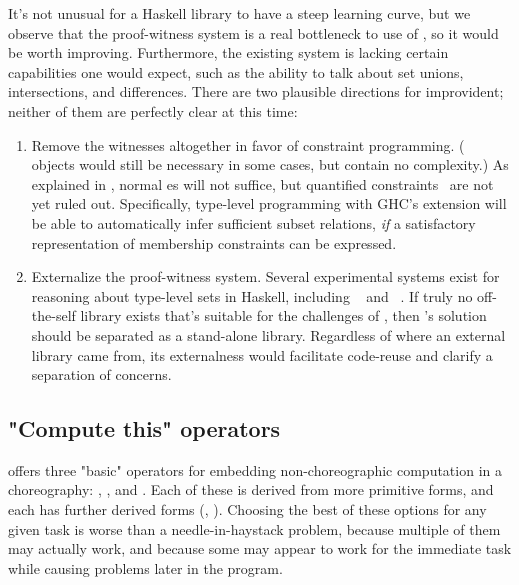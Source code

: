 It's not unusual for a Haskell library to have a steep learning curve,
but we observe that the proof-witness system is a real bottleneck to use of \MultiChor,
so it would be worth improving.
Furthermore, the existing system is lacking certain capabilities one would expect,
such as the ability to talk about set unions, intersections, and differences.
There are two plausible directions for improvident;
neither of them are perfectly clear at this time:
\begin{enumerate}
	\item Remove the witnesses altogether in favor of constraint programming.
		( objects would still be necessary in some cases, but contain no complexity.)
		As explained in , normal es will not suffice,
		but quantified constraints~\cite{bottu2017} are not yet ruled out.
		Specifically, type-level programming with GHC's  extension
		will be able to automatically infer sufficient subset relations,
		\emph{if} a satisfactory representation of membership constraints can be expressed.
	\item Externalize the proof-witness system.
		Several experimental systems exist for reasoning about type-level sets in Haskell,
		including ~\cite{gdp_hackage} and ~\cite{tls_hackage}.
		If truly no off-the-self library exists that's suitable for the challenges of \MultiChor,
		then \MultiChor's solution should be separated as a stand-alone library.
		Regardless of where an external library came from, its externalness would facilitate code-reuse 
		and clarify a separation of concerns.
\end{enumerate}

\subsection{"Compute this" operators}

\MultiChor offers three "basic" operators for embedding non-choreographic computation in a choreography:
, , and .
Each of these is derived from more primitive forms, and each has further derived forms
(\eg {}, ).
Choosing the best of these options for any given task is worse than a needle-in-haystack problem,
because multiple of them may actually work,
and because some may appear to work for the immediate task while causing problems later in the program.

